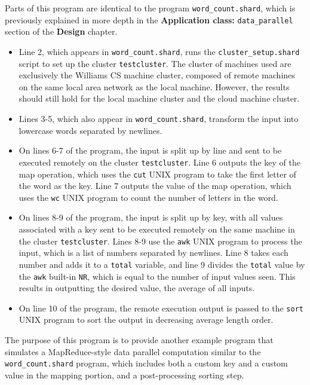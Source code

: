 \documentclass[oneside]{report}
\begin{document}
Parts of this program are identical to the program \texttt{word\_count.shard}, which is previously explained in more depth in the \textbf{Application class: }\texttt{data\_parallel} section of the \textbf{Design} chapter.

\begin{itemize}
  \item
        Line 2, which appears in \texttt{word\_count.shard}, runs the \texttt{cluster\_setup.shard} script to set up the cluster \texttt{testcluster}.
        The cluster of machines used are exclusively the Williams CS machine cluster, composed of remote machines on the same local area network as the local machine. However, the results should still hold for the local machine cluster and the cloud machine cluster.
  \item Lines 3-5, which also appear in \texttt{word\_count.shard}, transform the input into lowercase words separated by newlines.
  \item On lines 6-7 of the program, the input is split up by line and sent to be executed remotely on the cluster \texttt{testcluster}.
        Line 6 outputs the key of the map operation, which uses the \texttt{cut} UNIX program to take the first letter of the word as the key.
        Line 7 outputs the value of the map operation, which uses the \texttt{wc} UNIX program to count the number of letters in the word.
  \item  On lines 8-9 of the program, the input is split up by key, with all values associated with a key sent to be executed remotely on the same machine in the cluster \texttt{testcluster}.
        Lines 8-9 use the \texttt{awk} UNIX program to process the input, which is a list of numbers separated by newlines.
        Line 8 takes each number and adds it to a \texttt{total} variable, and line 9 divides the \texttt{total} value by the \texttt{awk} built-in \texttt{NR}, which is equal to the number of input values seen. This results in outputting the desired value, the average of all inputs.
  \item On line 10 of the program, the remote execution output is passed to the \texttt{sort} UNIX program to sort the output in decreasing average length order.
\end{itemize}
The purpose of this program is to provide another example program that simulates a MapReduce-style data parallel computation similar to the \texttt{word\_count.shard} program, which includes both a custom key and a custom value in the mapping portion, and a post-processing sorting step.
\end{document}
